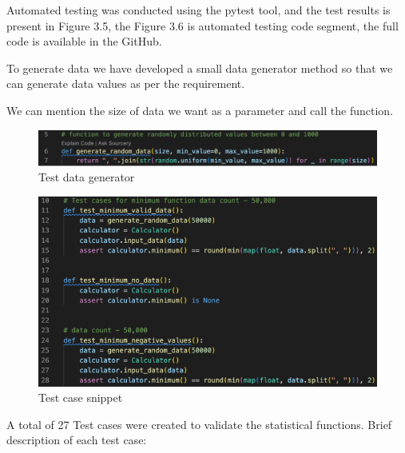 \documentclass[english,12pt,a4paper]{report}
\begin{document}
	Automated testing was conducted using the pytest tool, and the test results is present in Figure 3.5, the Figure 3.6 is automated testing code segment, the full code is available in the GitHub.
	
	To generate data we have developed a small data generator method so that we can generate data values as per the requirement. 
	
	We can mention the size of data we want as a parameter and call the function.
	
	\begin{figure}[H]
		\centering
		\includegraphics[width=0.8\linewidth]{images/data_generator_testing.png}
		\caption{Test data generator}
		\label{fig:Test data generator}
	\end{figure}
	
	\begin{figure}[H]
		\centering
		\includegraphics[width=0.8\linewidth]{images/test_cases_pytest.png}
		\caption{Test case snippet}
		\label{fig:Test case snippet}
	\end{figure}
	
	A total of 27 Test cases were created to validate the statistical functions.
	Brief description of each test case:
	
\end{document}
